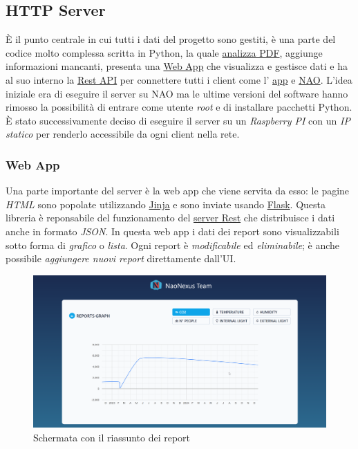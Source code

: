 \documentclass{optica-article}
\begin{document}
\vspace{12pt}
\subsection{HTTP Server}\label{sec:domotics_server}
È il punto centrale in cui tutti i dati del progetto sono gestiti, è una parte del codice molto complessa scritta in Python, la quale \hyperref[sec:domotics_pdf_analysis]{analizza PDF}, aggiunge informazioni mancanti, presenta una \hyperref[sec:domotics_web_app]{Web App} che visualizza e gestisce dati e ha al suo interno la \hyperref[sec:domotics_rest_api]{Rest API} per connettere tutti i client come l' \hyperref[sec:domotics_app]{app} e \hyperref[sec:domotics_nao]{NAO}. L'idea iniziale era di eseguire il server su NAO ma le ultime versioni del software hanno rimosso la possibilità di entrare come utente \emph{root} e di installare pacchetti Python. È stato successivamente deciso di eseguire il server su un  \emph{Raspberry PI} con un \emph{IP statico} per renderlo accessibile da ogni client nella rete.


\subsubsection{Web App}\label{sec:domotics_web_app}
Una parte importante del server è la web app che viene servita da esso: le pagine \emph{HTML} sono popolate utilizzando \href{https://jinja.palletsprojects.com/en/3.1.x/}{Jinja} e sono inviate usando \href{https://flask.palletsprojects.com/en/2.2.x/}{Flask}. Questa libreria è reponsabile del funzionamento del \hyperref[sec:domotics_rest_api]{server Rest} che distribuisce i dati anche in formato \emph{JSON}. In questa web app i dati dei report sono visualizzabili sotto forma di \emph{grafico} o \emph{lista}. Ogni report è \emph{modificabile} ed \emph{eliminabile}; è anche possibile \emph{aggiungere nuovi report} direttamente dall'UI. 

\begin{figure}[H]
    \centering
    \includegraphics[scale=0.26]{figures/web_app_summary.png}
    \caption{Schermata con il riassunto dei report}
    \label{fig:webb_app_summary}
\end{figure}
\end{document}
